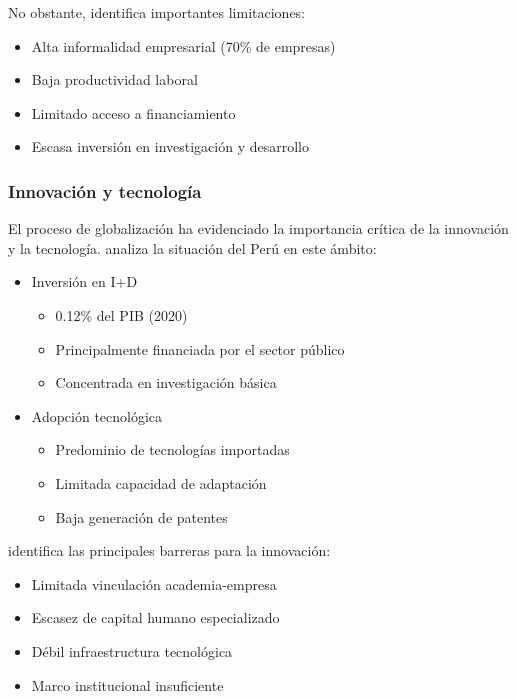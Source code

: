 \documentclass[12pt, a4paper]{article}
\begin{document}
No obstante, \textcite{villarreal2019} identifica importantes limitaciones:
\begin{itemize}
    \item Alta informalidad empresarial (70\% de empresas)
    \item Baja productividad laboral
    \item Limitado acceso a financiamiento
    \item Escasa inversión en investigación y desarrollo
\end{itemize}

\subsubsection{Innovación y tecnología}
El proceso de globalización ha evidenciado la importancia crítica de la innovación y la tecnología. \textcite{sagasti2020} analiza la situación del Perú en este ámbito:

\begin{itemize}
    \item Inversión en I+D
    \begin{itemize}
        \item 0.12\% del PIB (2020)
        \item Principalmente financiada por el sector público
        \item Concentrada en investigación básica
    \end{itemize}
    
    \item Adopción tecnológica
    \begin{itemize}
        \item Predominio de tecnologías importadas
        \item Limitada capacidad de adaptación
        \item Baja generación de patentes
    \end{itemize}
\end{itemize}

\textcite{peters2021} identifica las principales barreras para la innovación:
\begin{itemize}
    \item Limitada vinculación academia-empresa
    \item Escasez de capital humano especializado
    \item Débil infraestructura tecnológica
    \item Marco institucional insuficiente
\end{itemize}
\end{document}
